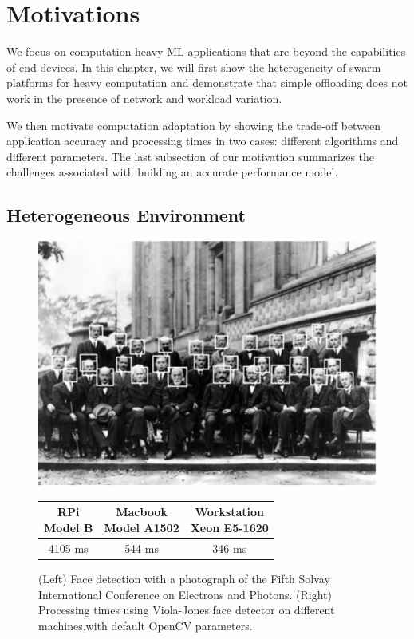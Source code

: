 \section{Motivations}
\label{sec:motivation}

We focus on computation-heavy ML applications that are beyond the capabilities
of end devices. In this chapter, we will first show the heterogeneity of swarm
platforms for heavy computation and demonstrate that simple offloading does not
work in the presence of network and workload variation.

We then motivate computation adaptation by showing the trade-off between
application accuracy and processing times in two cases: different algorithms and
different parameters. The last subsection of our motivation summarizes the
challenges associated with building an accurate performance model.

\subsection{Heterogeneous Environment}

\begin{figure}
  \begin{minipage}{0.4\textwidth}
    \centering
    \includegraphics[width=.9\textwidth]{figures/physicist.pdf}
    \label{fig:physicist}
  \end{minipage}%
  \begin{minipage}{0.6\textwidth}
    \centering
    \begin{tabular}{c c c}
      \toprule
      \specialcell{RPi\\Model B}
      & \specialcell{Macbook \\ Model A1502}
      & \specialcell{Workstation\\Xeon E5-1620} \\
      \midrule
      4105 ms & 544 ms & 346 ms \\
      \bottomrule
    \end{tabular}
  \end{minipage}
  \caption{(Left) Face detection with a photograph of the Fifth Solvay
    International Conference on Electrons and Photons. (Right) Processing times
    using Viola-Jones face detector on different machines,with default OpenCV
    parameters.}
  \label{fig:capabilities}
\end{figure}

